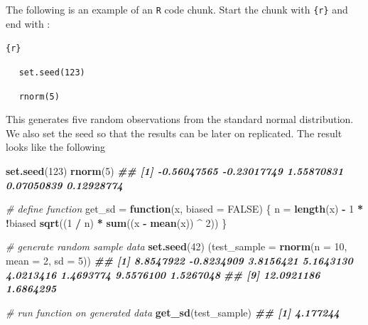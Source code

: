 \documentclass[
]{book}
\newenvironment{Shaded}{\begin{snugshade}}{\end{snugshade}}
\newcommand{\AttributeTok}[1]{\textcolor[rgb]{0.13,0.29,0.53}{#1}}
\newcommand{\CommentTok}[1]{\textcolor[rgb]{0.56,0.35,0.01}{\textit{#1}}}
\newcommand{\ConstantTok}[1]{\textcolor[rgb]{0.56,0.35,0.01}{#1}}
\newcommand{\ControlFlowTok}[1]{\textcolor[rgb]{0.13,0.29,0.53}{\textbf{#1}}}
\newcommand{\DecValTok}[1]{\textcolor[rgb]{0.00,0.00,0.81}{#1}}
\newcommand{\DocumentationTok}[1]{\textcolor[rgb]{0.56,0.35,0.01}{\textbf{\textit{#1}}}}
\newcommand{\FunctionTok}[1]{\textcolor[rgb]{0.13,0.29,0.53}{\textbf{#1}}}
\newcommand{\NormalTok}[1]{#1}
\newcommand{\OtherTok}[1]{\textcolor[rgb]{0.56,0.35,0.01}{#1}}
\newcommand{\SpecialCharTok}[1]{\textcolor[rgb]{0.81,0.36,0.00}{\textbf{#1}}}
\theoremstyle{definition}
\theoremstyle{definition}
\theoremstyle{definition}
\theoremstyle{definition}
\theoremstyle{remark}
\begin{document}
The following is an example of an \texttt{R} code chunk. Start the chunk with \texttt{\textasciigrave{}\textasciigrave{}\textasciigrave{}\{r\}} and end with \texttt{\textasciigrave{}\textasciigrave{}\textasciigrave{}}:

\texttt{\textasciigrave{}\textasciigrave{}\textasciigrave{}\{r\}}

\(\quad\) \texttt{set.seed(123)}

\(\quad\) \texttt{rnorm(5)}

\texttt{\textasciigrave{}\textasciigrave{}\textasciigrave{}}

This generates five random observations from the standard normal distribution. We also set the seed so that the results can be later on replicated. The result looks like the following

\begin{Shaded}
\begin{Highlighting}[]
    \FunctionTok{set.seed}\NormalTok{(}\DecValTok{123}\NormalTok{)}
    \FunctionTok{rnorm}\NormalTok{(}\DecValTok{5}\NormalTok{)}
\DocumentationTok{\#\# [1] {-}0.56047565 {-}0.23017749  1.55870831  0.07050839  0.12928774}
\end{Highlighting}
\end{Shaded}

\begin{Shaded}
\begin{Highlighting}[]
    \CommentTok{\# define function}
\NormalTok{    get\_sd }\OtherTok{=} \ControlFlowTok{function}\NormalTok{(x, }\AttributeTok{biased =} \ConstantTok{FALSE}\NormalTok{) \{}
\NormalTok{      n }\OtherTok{=} \FunctionTok{length}\NormalTok{(x) }\SpecialCharTok{{-}} \DecValTok{1} \SpecialCharTok{*} \SpecialCharTok{!}\NormalTok{biased}
      \FunctionTok{sqrt}\NormalTok{((}\DecValTok{1} \SpecialCharTok{/}\NormalTok{ n) }\SpecialCharTok{*} \FunctionTok{sum}\NormalTok{((x }\SpecialCharTok{{-}} \FunctionTok{mean}\NormalTok{(x)) }\SpecialCharTok{\^{}} \DecValTok{2}\NormalTok{))}
\NormalTok{    \}}
    
    \CommentTok{\# generate random sample data}
    \FunctionTok{set.seed}\NormalTok{(}\DecValTok{42}\NormalTok{)}
\NormalTok{    (}\AttributeTok{test\_sample =} \FunctionTok{rnorm}\NormalTok{(}\AttributeTok{n =} \DecValTok{10}\NormalTok{, }\AttributeTok{mean =} \DecValTok{2}\NormalTok{, }\AttributeTok{sd =} \DecValTok{5}\NormalTok{))}
\DocumentationTok{\#\#  [1]  8.8547922 {-}0.8234909  3.8156421  5.1643130  4.0213416  1.4693774  9.5576100  1.5267048}
\DocumentationTok{\#\#  [9] 12.0921186  1.6864295}
    
    \CommentTok{\# run function on generated data}
    \FunctionTok{get\_sd}\NormalTok{(test\_sample)}
\DocumentationTok{\#\# [1] 4.177244}
\end{Highlighting}
\end{Shaded}
\end{document}

